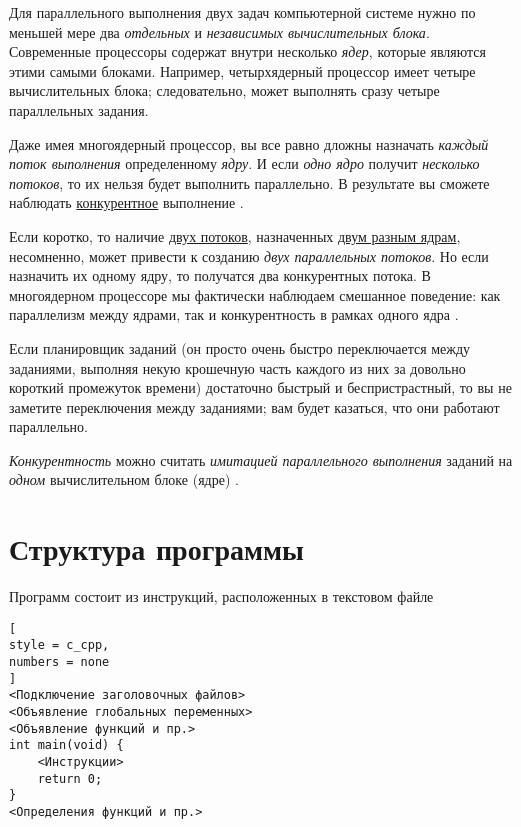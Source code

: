 \documentclass[%
	11pt,
	a4paper,
	utf8,
		]{article}
\begin{document}
Для параллельного выполнения двух задач компьютерной системе нужно по меньшей мере два \emph{отдельных} и \emph{независимых вычислительных блока}. Современные процессоры содержат внутри несколько \emph{ядер}, которые являются этими самыми блоками. Например, четырхядерный процессор имеет четыре вычислительных блока; следовательно, может выполнять сразу четыре параллельных задания.

Даже имея многоядерный процессор, вы все равно дложны назначать \emph{каждый поток выполнения} определенному \emph{ядру}. И если \emph{одно ядро} получит \emph{несколько потоков}, то их {\color{red}нельзя будет выполнить параллельно}. В результате вы сможете наблюдать \underline{конкурентное} выполнение \cite[]{amini-extreme-c:2022}.

Если коротко, то наличие \underline{двух потоков}, назначенных \underline{двум разным ядрам}, несомненно, может привести к созданию \emph{двух параллельных потоков}. Но если назначить их одному ядру, то получатся два конкурентных потока. В многоядерном процессоре мы фактически наблюдаем смешанное поведение: как параллелизм между ядрами, так и конкурентность в рамках одного ядра \cite[]{amini-extreme-c:2022}.

Если планировщик заданий (он просто очень быстро переключается между заданиями, выполняя некую крошечную часть каждого из них за довольно короткий промежуток времени) достаточно быстрый и беспристрастный, то вы не заметите переключения между заданиями; вам будет казаться, что они работают параллельно. 

\emph{Конкурентность} можно считать \emph{имитацией параллельного выполнения} заданий на \emph{одном} вычислительном блоке (ядре) \cite[]{amini-extreme-c:2022}.









\section{Структура программы}

Программ состоит из инструкций, расположенных в текстовом файле
\begin{lstlisting}[
style = c_cpp,
numbers = none
]
<Подключение заголовочных файлов>
<Объявление глобальных переменных>
<Объявление функций и пр.>
int main(void) {
    <Инструкции>
    return 0;
}
<Определения функций и пр.>
\end{lstlisting}
\end{document}
